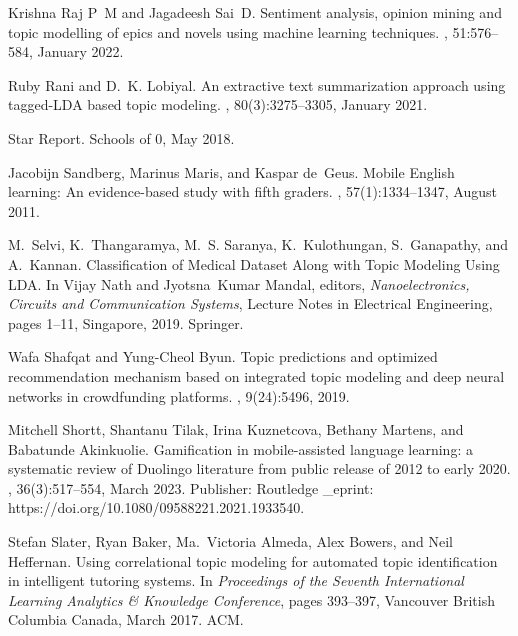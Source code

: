 \begin{thebibliography}{10}
Krishna Raj P~M and Jagadeesh Sai~D.
\newblock Sentiment analysis, opinion mining and topic modelling of epics and
  novels using machine learning techniques.
, 51:576--584, January 2022.

Ruby Rani and D.~K. Lobiyal.
\newblock An extractive text summarization approach using tagged-{LDA} based
  topic modeling.
, 80(3):3275--3305, January
  2021.

Star Report.
\newblock Schools of 0, May 2018.

Jacobijn Sandberg, Marinus Maris, and Kaspar de~Geus.
\newblock Mobile {English} learning: {An} evidence-based study with fifth
  graders.
, 57(1):1334--1347, August 2011.

M.~Selvi, K.~Thangaramya, M.~S. Saranya, K.~Kulothungan, S.~Ganapathy, and
  A.~Kannan.
\newblock Classification of {Medical} {Dataset} {Along} with {Topic} {Modeling}
  {Using} {LDA}.
\newblock In Vijay Nath and Jyotsna~Kumar Mandal, editors, {\em
  Nanoelectronics, {Circuits} and {Communication} {Systems}}, Lecture {Notes}
  in {Electrical} {Engineering}, pages 1--11, Singapore, 2019. Springer.

Wafa Shafqat and Yung-Cheol Byun.
\newblock Topic predictions and optimized recommendation mechanism based on
  integrated topic modeling and deep neural networks in crowdfunding platforms.
, 9(24):5496, 2019.

Mitchell Shortt, Shantanu Tilak, Irina Kuznetcova, Bethany Martens, and
  Babatunde Akinkuolie.
\newblock Gamification in mobile-assisted language learning: a systematic
  review of {Duolingo} literature from public release of 2012 to early 2020.
, 36(3):517--554, March
  2023.
\newblock Publisher: Routledge \_eprint:
  https://doi.org/10.1080/09588221.2021.1933540.

Stefan Slater, Ryan Baker, Ma.~Victoria Almeda, Alex Bowers, and Neil
  Heffernan.
\newblock Using correlational topic modeling for automated topic identification
  in intelligent tutoring systems.
\newblock In {\em Proceedings of the {Seventh} {International} {Learning}
  {Analytics} \& {Knowledge} {Conference}}, pages 393--397, Vancouver British
  Columbia Canada, March 2017. ACM.


\end{thebibliography}

